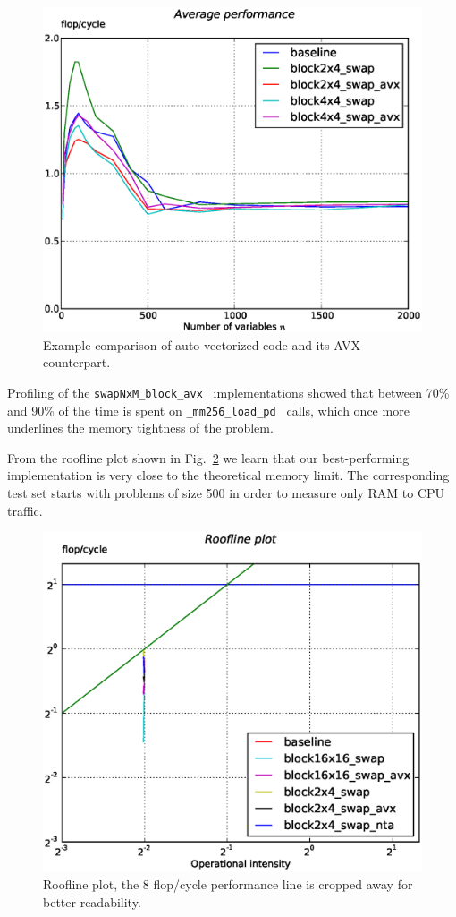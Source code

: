 \documentclass[letterpaper]{article}
\begin{document}
\begin{figure}\centering
  \includegraphics[scale=0.4]{img/results_avx.eps}
  \caption{Example comparison of auto-vectorized code and its AVX counterpart.\label{fig:res_avx}}
\end{figure}

Profiling of the {\tt swapNxM\_block\_avx } implementations showed that between 70\% and 90\% of the time is spent on {\tt \_mm256\_load\_pd } calls,
which once more underlines the memory tightness of the problem.

From the roofline plot shown in Fig.~\ref{fig:res_roof_high} we learn that our best-performing implementation is very close to the theoretical memory limit.
The corresponding test set starts with problems of size 500 in order to measure only RAM to CPU traffic.

\begin{figure}\centering
  \includegraphics[scale=0.4]{img/roof_high_autovec.eps}
  \caption{Roofline plot, the 8 flop/cycle performance line is cropped away for better readability.\label{fig:res_roof_high}}
\end{figure}
\end{document}

